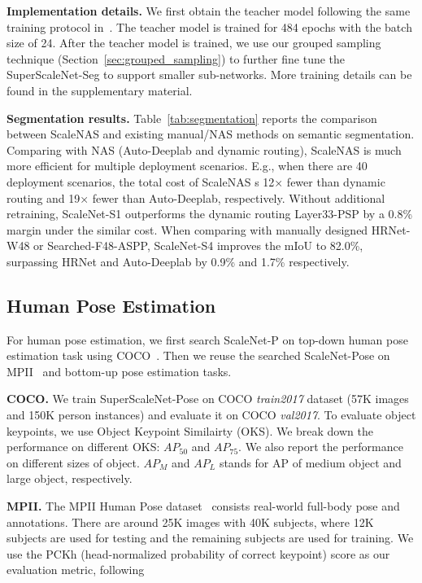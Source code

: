 \documentclass[final]{cvpr}
\newcommand{\workname}{ScaleNAS\xspace}
\newcommand{\netname}{ScaleNet\xspace}
\newcommand{\supernet}{SuperScaleNet\xspace}
\begin{document}
\noindent\textbf{Implementation details.} We first obtain the teacher model following the same training protocol in~\cite{zhao2018psanet, wang2020deep}. 
The teacher model is trained for 484 epochs with the batch size of 24. 
After the teacher model is trained, we use our grouped sampling technique (Section~\ref{sec:grouped_sampling}) to further fine tune the \supernet-Seg to support smaller sub-networks. More training details can be found in the supplementary material.

\noindent\textbf{Segmentation results.} 
Table~\ref{tab:segmentation} reports the comparison between \workname and existing manual/NAS methods on semantic segmentation. Comparing with NAS (Auto-Deeplab and dynamic routing), \workname is much more efficient for multiple deployment scenarios. 
E.g., when there are 40 deployment scenarios, the total cost of \workname s 12× fewer than dynamic routing and 19× fewer than Auto-Deeplab, respectively. Without additional retraining, \netname-S1 outperforms the dynamic routing Layer33-PSP by a 0.8\% margin under the similar cost. When comparing with manually designed HRNet-W48 or Searched-F48-ASPP, \netname-S4 improves the mIoU to 82.0\%, surpassing HRNet and Auto-Deeplab by 0.9\% and 1.7\% respectively.


\subsection{Human Pose Estimation}
For human pose estimation, we first search \netname-P on top-down human pose estimation task using COCO~\cite{lin2014microsoft}. Then we reuse the searched \netname-Pose on MPII~\cite{andriluka20142d} and bottom-up pose estimation tasks.

\noindent\textbf{COCO.}
We train \supernet-Pose on COCO \textit{train2017} dataset (57K images and 150K person instances) and evaluate it on COCO \textit{val2017}. To evaluate object keypoints, we use Object Keypoint Similairty (OKS). We break down the performance on  different OKS: $AP_{50}$ and $AP_{75}$. We also report the performance on different sizes of object. $AP_{M}$ and $AP_{L}$ stands for AP of medium object and large object, respectively.

\noindent\textbf{MPII.}
The MPII Human Pose dataset~\cite{andriluka20142d} consists real-world full-body pose and annotations. There are around 25K images with 40K subjects, where 12K subjects are used for testing and the remaining subjects are used for training. We use the PCKh (head-normalized probability of correct keypoint) score as our evaluation metric, following~\cite{xiao2018simple, sun2019deep}
\end{document}
